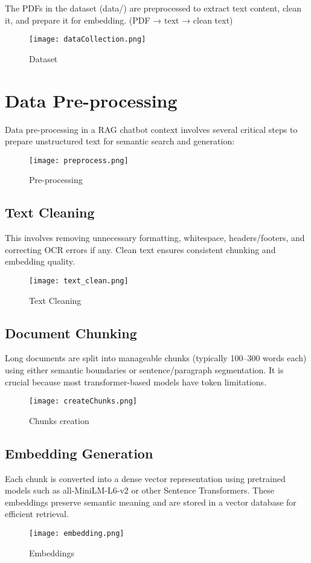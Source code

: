 \documentclass[12pt]{report}
\begin{document}
The PDFs in the dataset (data/) are preprocessed to extract text content, clean it, and prepare it for embedding.
(PDF → text → clean text)
\\

\begin{figure}[h]
    \centering
    \texttt{[image: dataCollection.png]}
    \caption{Dataset}
\end{figure}


\section{Data Pre-processing}
Data pre-processing in a RAG chatbot context involves several critical steps to prepare unstructured text for semantic search and generation:
\\
\begin{figure}[h]
    \centering
    \texttt{[image: preprocess.png]}
    \caption{Pre-processing}
\end{figure}

\newpage
\subsection{Text Cleaning}
This involves removing unnecessary formatting, whitespace, headers/footers, and correcting OCR errors if any. Clean text ensures consistent chunking and embedding quality.

\begin{figure}[h]
    \centering
    \texttt{[image: text\_clean.png]}
    \caption{Text Cleaning}
\end{figure}


\subsection{Document Chunking}
Long documents are split into manageable chunks (typically 100–300 words each) using either semantic boundaries or sentence/paragraph segmentation. It is crucial because most transformer-based models have token limitations.
\\
\begin{figure}[h]
    \centering
    \texttt{[image: createChunks.png]}
    \caption{Chunks creation}
\end{figure}

\newpage
\subsection{Embedding Generation}
Each chunk is converted into a dense vector representation using pretrained models such as all-MiniLM-L6-v2 or other Sentence Transformers. These embeddings preserve semantic meaning and are stored in a vector database for efficient retrieval.
\\
\begin{figure}[h]
    \centering
    \texttt{[image: embedding.png]}
    \caption{Embeddings}
\end{figure}
\end{document}
